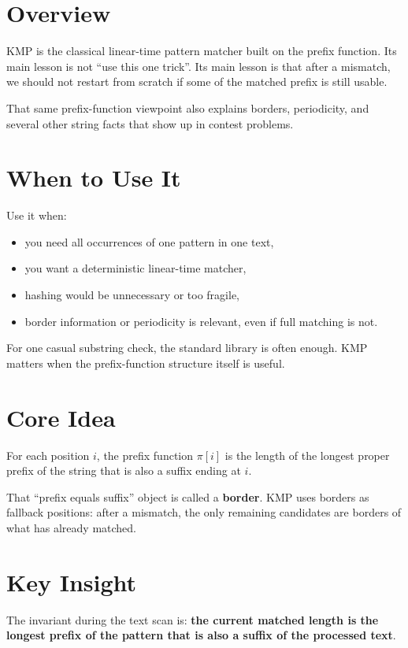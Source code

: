 \section*{Overview}

KMP is the classical linear-time pattern matcher built on the prefix function. Its main lesson is not ``use this one
trick''. Its main lesson is that after a mismatch, we should not restart from scratch if some of the matched prefix is
still usable.

That same prefix-function viewpoint also explains borders, periodicity, and several other string facts that show up in
contest problems.

\section*{When to Use It}

Use it when:

\begin{itemize}
  \item you need all occurrences of one pattern in one text,
  \item you want a deterministic linear-time matcher,
  \item hashing would be unnecessary or too fragile,
  \item border information or periodicity is relevant, even if full matching is not.
\end{itemize}

For one casual substring check, the standard library is often enough. KMP matters when the prefix-function structure
itself is useful.

\section*{Core Idea}

For each position \(i\), the prefix function \(\pi[i]\) is the length of the longest proper prefix of the string that
is also a suffix ending at \(i\).

That ``prefix equals suffix'' object is called a \textbf{border}. KMP uses borders as fallback positions: after a
mismatch, the only remaining candidates are borders of what has already matched.

\section*{Key Insight}

The invariant during the text scan is:
\textbf{the current matched length is the longest prefix of the pattern that is also a suffix of the processed text}.

